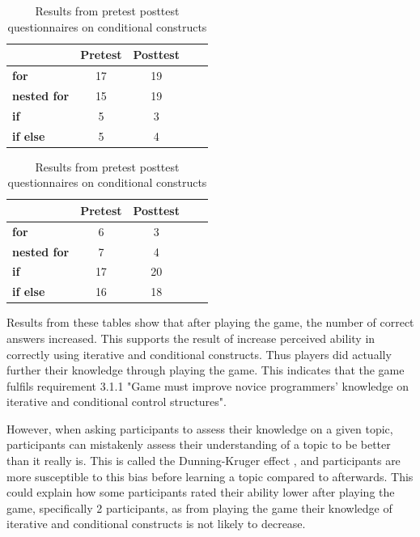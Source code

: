 \documentclass[a4paper,11.5pt]{report}
\numberwithin{figure}{section}
\numberwithin{table}{section}
\numberwithin{equation}{section}
\numberwithin{equation}{section}
\begin{document}
\begin{table}[H]
\parbox{.45\linewidth}{
\centering
\caption{Results from pretest posttest questionnaires on iterative constructs}
\label{tab:iterativeknowledge}
\begin{tabular}{l|cccc}
          & Pretest & Posttest \\ \hline
\textbf{for}     & 17                                     & 19
\\ \hline
\textbf{nested for} & 15                                     & 19 
\\ \hline
\textbf{if} & 5                                     & 3                       
\\ \hline
\textbf{if else} & 5                                     & 4
\end{tabular}
}
\hfill
\parbox{.45\linewidth}{
\centering
\caption{Results from pretest posttest questionnaires on conditional constructs}
\label{tab:conditionalknowledge}
\begin{tabular}{l|cccc}
          & Pretest & Posttest  \\ \hline
\textbf{for}     & 6                                     & 3                         
\\ \hline
\textbf{nested for} & 7                                     & 4                        
\\ \hline
\textbf{if} & 17                                     & 20                         
\\ \hline
\textbf{if else} & 16                                     & 18  
\end{tabular}
}
\end{table}

Results from these tables show that after playing the game, the number of correct answers increased. This supports the result of increase perceived ability in correctly using iterative and conditional constructs.  Thus players did actually further their knowledge through playing the game. This indicates that the game fulfils requirement 3.1.1 "Game must improve novice programmers' knowledge on iterative and conditional control structures". 

However, when asking participants to assess their knowledge on a given topic, participants can mistakenly assess their understanding of a topic to be better than it really is. This is called the Dunning-Kruger effect \citep{dunning2011}, and participants are more susceptible to this bias before learning a topic compared to afterwards. This could explain how some participants rated their ability lower after playing the game, specifically 2 participants, as from playing the game their knowledge of iterative and conditional constructs is not likely to decrease.
\end{document}
